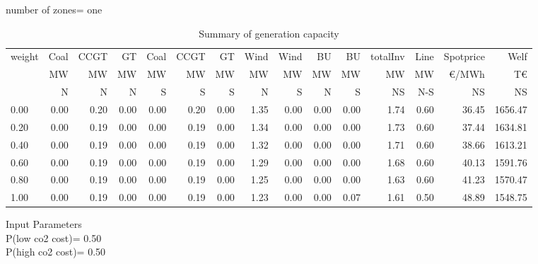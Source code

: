 \documentclass[landscape]{article}
\begin{document}
number of zones= one\\
\begin{table}[htb]\caption{Summary of generation capacity}
\begin{tabular}{l|rrrrrr|rr|rr|rr|rr}
\toprule
 weight &    Coal &     CCGT &      GT &   Coal  &   CCGT &      GT &    Wind &    Wind  &  BU  &  BU  & totalInv  &    Line   &  Spotprice   &  Welf   \\
        &      MW &       MW &      MW &      MW &     MW &      MW &      MW &      MW  &  MW  &  MW  &    MW     &    MW     &  \euro/MWh &  T\euro   \\
        &       N &       N  &      N  &      S  &      S &       S &       N &       S  &  N   &  S   &    NS     &    N-S    &  NS      &   NS    \\
\midrule
        0.00&        0.00&        0.20&        0.00&        0.00&        0.20&        0.00&        1.35&        0.00&        0.00&        0.00&        1.74&        0.60&       36.45&     1656.47\\
        0.20&        0.00&        0.19&        0.00&        0.00&        0.19&        0.00&        1.34&        0.00&        0.00&        0.00&        1.73&        0.60&       37.44&     1634.81\\
        0.40&        0.00&        0.19&        0.00&        0.00&        0.19&        0.00&        1.32&        0.00&        0.00&        0.00&        1.71&        0.60&       38.66&     1613.21\\
        0.60&        0.00&        0.19&        0.00&        0.00&        0.19&        0.00&        1.29&        0.00&        0.00&        0.00&        1.68&        0.60&       40.13&     1591.76\\
        0.80&        0.00&        0.19&        0.00&        0.00&        0.19&        0.00&        1.25&        0.00&        0.00&        0.00&        1.63&        0.60&       41.23&     1570.47\\
        1.00&        0.00&        0.19&        0.00&        0.00&        0.19&        0.00&        1.23&        0.00&        0.00&        0.07&        1.61&        0.50&       48.89&     1548.75\\
\bottomrule
\end{tabular}
\end{table}
\clearpage
\noindent
Input Parameters\\
P(low co2 cost)=         0.50\\
P(high co2 cost)=         0.50\\
\end{document}
